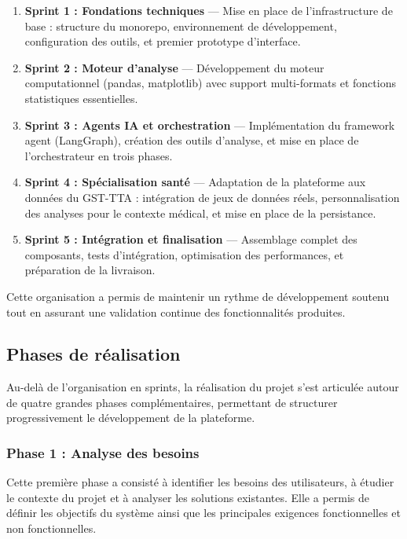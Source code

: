\begin{enumerate}
  \item \textbf{Sprint 1 : Fondations techniques} — Mise en place de l'infrastructure de base : structure du monorepo, environnement de développement, configuration des outils, et premier prototype d'interface.
  
  \item \textbf{Sprint 2 : Moteur d'analyse} — Développement du moteur computationnel (pandas, matplotlib) avec support multi-formats et fonctions statistiques essentielles.
  
  \item \textbf{Sprint 3 : Agents IA et orchestration} — Implémentation du framework agent (LangGraph), création des outils d'analyse, et mise en place de l'orchestrateur en trois phases.
  
  \item \textbf{Sprint 4 : Spécialisation santé} — Adaptation de la plateforme aux données du GST-TTA : intégration de jeux de données réels, personnalisation des analyses pour le contexte médical, et mise en place de la persistance.
  
  \item \textbf{Sprint 5 : Intégration et finalisation} — Assemblage complet des composants, tests d'intégration, optimisation des performances, et préparation de la livraison.
\end{enumerate}

Cette organisation a permis de maintenir un rythme de développement soutenu tout en assurant une validation continue des fonctionnalités produites.

\subsection{Phases de réalisation}

Au-delà de l'organisation en sprints, la réalisation du projet s'est articulée autour de quatre grandes phases complémentaires, permettant de structurer progressivement le développement de la plateforme.

\subsubsection{Phase 1 : Analyse des besoins}

Cette première phase a consisté à identifier les besoins des utilisateurs, à étudier le contexte du projet et à analyser les solutions existantes. Elle a permis de définir les objectifs du système ainsi que les principales exigences fonctionnelles et non fonctionnelles.

